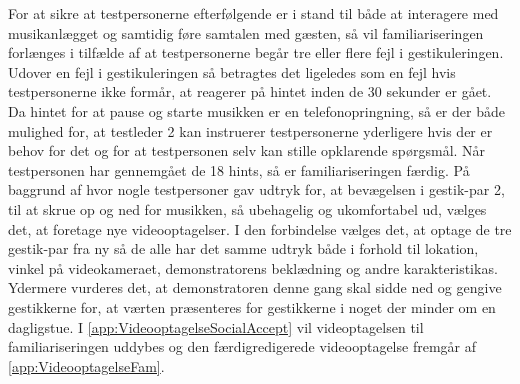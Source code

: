 For at sikre at testpersonerne efterfølgende er i stand til både at interagere med musikanlægget og samtidig føre samtalen med gæsten, så vil familiariseringen forlænges i tilfælde af at testpersonerne begår tre eller flere fejl i gestikuleringen. Udover en fejl i gestikuleringen så betragtes det ligeledes som en fejl hvis testpersonerne ikke formår, at reagerer på hintet inden de 30 sekunder er gået. Da hintet for at pause og starte musikken er en telefonopringning, så er der både mulighed for, at testleder 2 kan instruerer testpersonerne yderligere hvis der er behov for det og for at testpersonen selv kan stille opklarende spørgsmål. Når testpersonen har gennemgået de 18 hints, så er familiariseringen færdig.\blankline
%
På baggrund af  hvor nogle testpersoner gav udtryk for, at bevægelsen i gestik-par 2, til at skrue op og ned for musikken, så ubehagelig og ukomfortabel ud, vælges det, at foretage nye videooptagelser. I den forbindelse vælges det, at optage de tre gestik-par fra ny så de alle har det samme udtryk både i forhold til lokation, vinkel på videokameraet, demonstratorens beklædning og andre karakteristikas. Ydermere vurderes det, at demonstratoren denne gang skal sidde ned og gengive gestikkerne for, at værten præsenteres for gestikkerne i noget der minder om en dagligstue. I \autoref{app:VideooptagelseSocialAccept} vil videoptagelsen til familiariseringen uddybes og den færdigredigerede videooptagelse fremgår af \autoref{app:VideooptagelseFam}.


